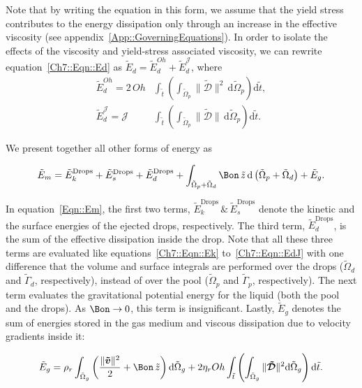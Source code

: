 \begin{subappendices}
\noindent Note that by writing the equation in this form, we assume that the yield stress contributes to the energy dissipation only through an increase in the effective viscosity (see appendix~\ref{App::GoverningEquations}). In order to isolate the effects of the viscosity and yield-stress associated viscosity, we can rewrite equation~\eqref{Ch7::Eqn::Ed} as $\tilde E_d = \tilde E_d^{Oh} + \tilde E_d^\mathcal{J}$, where
\begin{align}
	\label{Ch7::Eqn::EdOh}
	\tilde E_d^{Oh} = 2\, Oh&\int_{\tilde t}\left(\int_{\tilde \Omega_p}\|\boldsymbol{\tilde{\mathcal{D}}}\|^2\,\mathrm{d}\tilde\Omega_p\right)\mathrm{d}\tilde t,\\
	\label{Ch7::Eqn::EdJ}
	\tilde E_d^\mathcal{J} = \mathcal{J}&\int_{\tilde t}\left(\int_{\tilde\Omega_p}\|\boldsymbol{\tilde{\mathcal{D}}}\|\,\mathrm{d}\tilde\Omega_p\right)\mathrm{d}\tilde t.
\end{align}

We present together all other forms of energy as

\begin{equation}\label{Eqn::Em}
	\tilde E_m = \tilde E_k^\text{Drops} + \tilde E_s^\text{Drops} + \tilde E_d^\text{Drops} + \int_{\tilde \Omega_p+\tilde \Omega_d}\Bon\,\tilde z\,\mathrm{d}\left(\tilde \Omega_p+\tilde \Omega_d\right)  + \tilde E_g. 
\end{equation}

In equation~\eqref{Eqn::Em}, the first two terms, $\tilde E_k^\text{Drops}\,\&\,\tilde E_s^\text{Drops}$ denote the kinetic and the surface energies of the ejected drops, respectively. The third term, $\tilde E_d^\text{Drops}$, is the sum of the effective dissipation inside the drop. Note that all these three terms are evaluated like equations~\eqref{Ch7::Eqn::Ek} to~\eqref{Ch7::Eqn::EdJ} with one difference that the volume and surface integrals are performed over the drops ($\tilde \Omega_d$ and $\tilde \Gamma_d$, respectively), instead of over the pool ($\tilde \Omega_p$ and $\tilde \Gamma_p$, respectively). The next term evaluates the gravitational potential energy for the liquid (both the pool and the drops). As $\Bon \to 0$, this term is insignificant. Lastly, $\tilde E_g$ denotes the sum of energies stored in the gas medium and viscous dissipation due to velocity gradients inside it:

\begin{equation}\label{Eqn::Eg}
	\tilde E_g = \rho_r\int_{\tilde \Omega_g}\left(\frac{\|\boldsymbol{\tilde v}\|^2}{2} + \Bon\,\tilde z\right)\mathrm{d}\tilde \Omega_g + 2\eta_rOh\int_{\tilde t}\left(\int_{\tilde \Omega_g}\|\boldsymbol{\tilde{\mathcal{D}}}\|^2\mathrm{d}\tilde \Omega_g\right)\mathrm{d}\tilde t.
\end{equation}


\end{subappendices}
